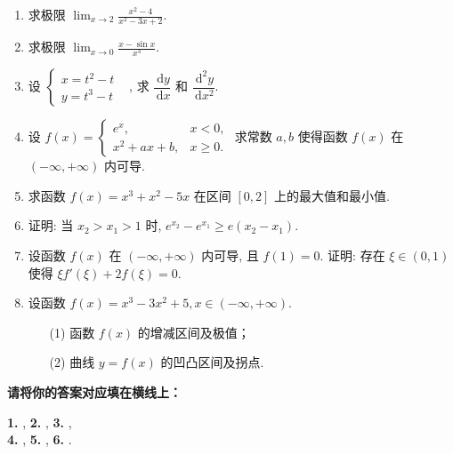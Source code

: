 \documentclass[simple]{hfutexam}
\newcommand{\diff}{\,\mathrm{d}}
\begin{document}
\begin{enumerate}
\item 求极限 $\displaystyle\lim_{x\to2}\frac{x^2-4}{x^2-3x+2}$.
\item 求极限 $\displaystyle\lim_{x\to0}\frac{x-\sin x}{x^3}$.
\item 设 $\begin{cases}x=t^2-t&\\y=t^3-t&\end{cases}$, 求 $\dfrac{\diff y}{\diff x}$ 和 $\dfrac{\diff^2 y}{\diff x^2}$.
\item 设 $f(x)=\begin{cases}e^x,&x<0,\\x^2+ax+b,&x\ge0.\end{cases}$
求常数 $a,b$ 使得函数 $f(x)$ 在 $(-\infty,+\infty)$ 内可导.
\item	求函数 $f(x)=x^3+x^2-5x$ 在区间 $[0,2]$ 上的最大值和最小值.
\item 证明: 当 $x_2>x_1>1$ 时, $e^{x_2}-e^{x_1}\ge e(x_2-x_1)$.
\item 设函数 $f(x)$ 在 $(-\infty,+\infty)$ 内可导, 且 $f(1)=0$.
证明: 存在 $\xi\in(0,1)$ 使得 $\xi f'(\xi)+2f(\xi)=0$.
\item 设函数 $f(x)=x^3-3x^2+5, x\in(-\infty,+\infty)$. 
\begin{enumerate}
\item[(1)] 函数 $f(x)$ 的增减区间及极值；
\item[(2)] 曲线 $y=f(x)$ 的凹凸区间及拐点.
\end{enumerate}
\end{enumerate}

\newpage
{}
\maketitle


\textbf{请将你的答案对应填在横线上：}

\textbf{1.} ,
\textbf{2.} \fillblank{3.5cm}{1cm}{$-2\sin(2x+1)\diff x$},
\textbf{3.} ,\\
\textbf{4.} ,
\textbf{5.} ,
\textbf{6.} .
\end{document}
